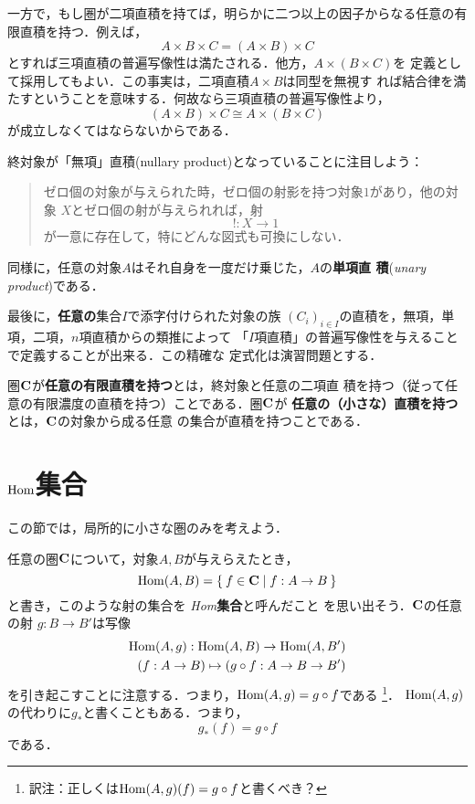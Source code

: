 一方で，もし圏が二項直積を持てば，明らかに二つ以上の因子からなる任意の有
限直積を持つ．例えば，
\[
 A \times B \times C = (A \times B) \times C
\]
とすれば三項直積の普遍写像性は満たされる．他方，$A\times (B\times C)$を
定義として採用してもよい．この事実は，二項直積$A\times B$は同型を無視す
れば結合律を満たすということを意味する．何故なら三項直積の普遍写像性より，
\[
 (A \times B) \times C \cong A \times (B \times C)
\]
が成立しなくてはならないからである．

終対象が「無項」直積(nullary product)となっていることに注目しよう：
\begin{quotation}
 ゼロ個の対象が与えられた時，ゼロ個の射影を持つ対象$1$があり，他の対象
 $X$とゼロ個の射が与えられれば，射
 \[
  ! : X \to 1
 \]
 が一意に存在して，特にどんな図式も可換にしない．
\end{quotation}
同様に，任意の対象$A$はそれ自身を一度だけ乗じた，$A$の{\bfseries 単項直
積}({\itshape unary product})である．

最後に，{\bfseries 任意の}集合$I$で添字付けられた対象の族
$(C_i)_{i \in I}$の直積を，無項，単項，二項，$n$項直積からの類推によって
「$I$項直積」の普遍写像性を与えることで定義することが出来る．この精確な
定式化は演習問題とする．

\begin{definition}
 圏${\bf C}$が{\bfseries 任意の有限直積を持つ}とは，終対象と任意の二項直
 積を持つ（従って任意の有限濃度の直積を持つ）ことである．圏${\bf C}$が
 {\bfseries 任意の（小さな）直積を持つ}とは，${\bf C}$の対象から成る任意
 の集合が直積を持つことである．
\end{definition}
\section{$\mathrm{Hom}$集合}
この節では，局所的に小さな圏のみを考えよう．

任意の圏${\bf C}$について，対象$A, B$が与えらえたとき，
\[
 \mathrm{Hom}(A, B) = \Set{f \in {\bf C} | f: A \to B}
\]
と書き，このような射の集合を {\itshape Hom}{\bfseries 集合}と呼んだこと
を思い出そう．${\bf C}$の任意の射 $g: B \to B'$は写像
\begin{align*}
 \mathrm{Hom}(A, g): \mathrm{Hom}(A, B) \to \mathrm{Hom}(A, B')\\
 (f: A \to B) \mapsto (g \circ f : A \to B \to B')
\end{align*}
を引き起こすことに注意する．つまり，$\mathrm{Hom}(A, g) = g \circ f$である
\footnote{訳注：正しくは$\mathrm{Hom}(A, g)(f) = g \circ f$と書くべき？}．
$\mathrm{Hom}(A, g)$の代わりに$g_{\ast}$と書くこともある．つまり，
\[
 g_{\ast}(f) = g \circ f
\]
である．

